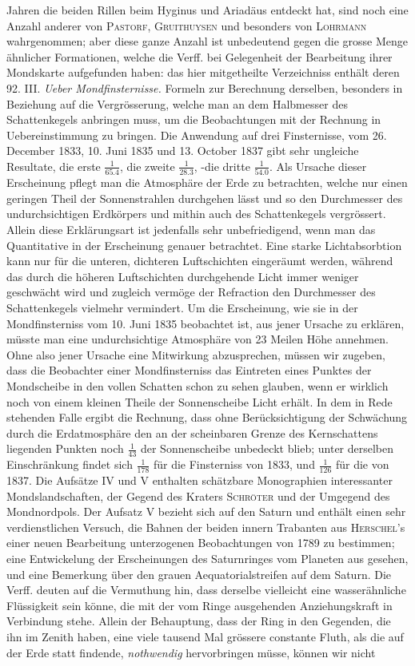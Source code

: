 \noindent Jahren die beiden Rillen beim Hyginus und Ariadäus entdeckt hat, sind noch eine Anzahl anderer von \textsc{Pastorf}, \textsc{Gruithuysen} und besonders von \textsc{Lohrmann} wahrgenommen; aber diese ganze Anzahl ist unbedeutend gegen die grosse Menge ähnlicher Formationen, welche die Verff. bei Gelegenheit der Bearbeitung ihrer Mondskarte aufgefunden haben: das hier mitgetheilte Verzeichniss enthält deren 92. III. \emph{Ueber Mondfinsternisse.} Formeln zur Berechnung derselben, besonders in Beziehung auf die Vergrösserung, welche man an dem Halbmesser des Schattenkegels anbringen muss, um die Beobachtungen mit der Rechnung in Uebereinstimmung zu bringen. Die Anwendung auf drei Finsternisse, vom 26. December 1833, 10. Juni 1835 und 13. October 1837 gibt sehr ungleiche Resultate, die erste $\frac{1}{65.4}$, die zweite $\frac{1}{28.3}$, -die dritte $\frac{1}{54.0}$. Als Ursache dieser Erscheinung pflegt man die Atmosphäre der Erde zu betrachten, welche nur einen geringen Theil der Sonnenstrahlen durchgehen lässt und so den Durchmesser des undurchsichtigen Erdkörpers und mithin auch des Schattenkegels vergrössert. Allein diese Erklärungsart ist jedenfalls sehr unbefriedigend, wenn man das Quantitative in der Erscheinung genauer betrachtet. Eine starke Lichtabsorbtion kann nur für die unteren, dichteren Luftschichten eingeräumt werden, während das durch die höheren Luftschichten durchgehende Licht immer weniger geschwächt wird und zugleich vermöge der Refraction den Durchmesser des Schattenkegels vielmehr vermindert. Um die Erscheinung, wie sie in der Mondfinsterniss vom 10. Juni 1835 beobachtet ist, aus jener Ursache zu erklären, müsste man eine undurchsichtige Atmosphäre von 23 Meilen Höhe annehmen. Ohne also jener Ursache eine Mitwirkung abzusprechen, müssen wir zugeben, dass die Beobachter einer Mondfinsterniss das Eintreten eines Punktes der Mondscheibe in den vollen Schatten schon zu sehen glauben, wenn er wirklich noch von einem kleinen Theile der Sonnenscheibe Licht erhält. In dem in Rede stehenden Falle ergibt die Rechnung, dass ohne Berücksichtigung der Schwächung durch die Erdatmosphäre den an der scheinbaren Grenze des Kernschattens liegenden Punkten noch $\frac{1}{43}$ der Sonnenscheibe unbedeckt blieb; unter derselben Einschränkung findet sich $\frac{1}{178}$ für die Finsterniss von 1833, und $\frac{1}{126}$ für die von 1837. Die Aufsätze IV und V enthalten schätzbare Monographien interessanter Mondslandschaften, der Gegend des Kraters \textsc{Schröter} und der Umgegend des Mondnordpols. Der Aufsatz V bezieht sich auf den Saturn und enthält einen sehr verdienstlichen Versuch, die Bahnen der beiden innern Trabanten aus \textsc{Herschel}'s einer neuen Bearbeitung unterzogenen Beobachtungen von 1789 zu bestimmen; eine Entwickelung der Erscheinungen des Saturnringes vom Planeten aus gesehen, und eine Bemerkung über den grauen Aequatorialstreifen auf dem Saturn. Die Verff. deuten auf die Vermuthung hin, dass derselbe vielleicht eine wasserähnliche Flüssigkeit sein könne, die mit der vom Ringe ausgehenden Anziehungskraft in Verbindung stehe. Allein der Behauptung, dass der Ring in den Gegenden, die ihn im Zenith haben, eine viele tausend Mal grössere constante Fluth, als die auf der Erde statt findende, \emph{nothwendig} hervorbringen müsse, können wir nicht 